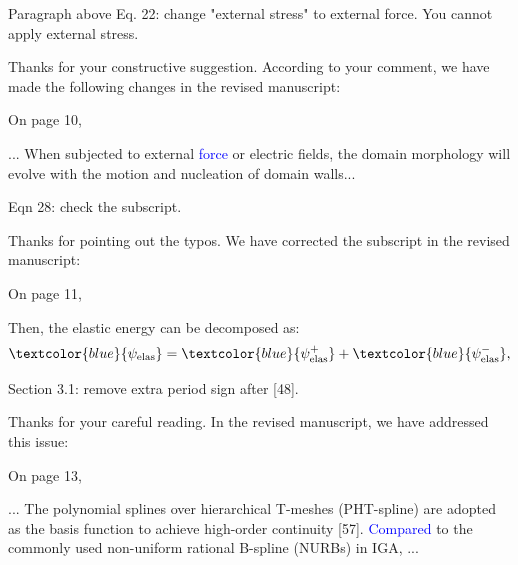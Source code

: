 \documentclass[12pt,fleqn]{article}
\begin{document}
\begin{question}{}
    Paragraph above Eq. 22: change "external stress" to external force. You cannot apply external stress.
\end{question}
\begin{response}
    Thanks for your constructive suggestion. According to your comment, we have made the following changes in the revised manuscript:

    On page 10, 
    \begin{revised}
        ... When subjected to external \textcolor{blue}{force} or electric fields, the domain morphology will evolve with the motion and nucleation of domain walls...
    \end{revised}
\end{response}

\begin{question}
    {}
    Eqn 28: check the subscript.
\end{question}
\begin{response}
    Thanks for pointing out the typos. We have corrected the subscript in the revised manuscript:

    On page 11,
    \setcounter{equation}{32}
    \begin{revised}
        Then, the elastic energy can be decomposed as:
    \begin{equation}
    \textcolor{blue}{\psi_\mathrm{elas}}=\textcolor{blue}{\psi_\mathrm{elas}^+}+\textcolor{blue}{\psi_\mathrm{elas}^-},
    \end{equation}
    \end{revised}
\end{response}

 \begin{question}
     {}
     Section 3.1: remove extra period sign after [48].
 \end{question}
 \begin{response}
     Thanks for your careful reading. In the revised manuscript, we have addressed this issue:

     On page 13,
     \begin{revised}
         ... The polynomial splines over hierarchical T-meshes (PHT-spline) are adopted as the basis function to achieve high-order continuity [57]. \textcolor{blue}{Compared} to the commonly used non-uniform rational B-spline (NURBs) in IGA, ...
     \end{revised}
 \end{response}
\end{document}
